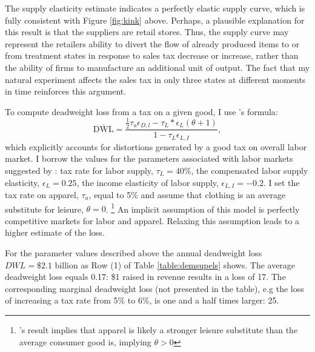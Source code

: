 \documentclass[12pt]{article}
\begin{document}
				
	The supply elasticity estimate indicates a perfectly elastic supply curve, which is fully consistent with Figure \ref{fig:kink} above. Perhaps, a plausible explanation for this result is that the suppliers are retail stores. Thus, the supply curve may represent the retailers ability to divert the flow of already produced items to or from treatment states in response to sales tax decrease or increase, rather than the ability of firms to manufacture an additional unit of output. The fact that my natural experiment affects the sales tax in only three states at different moments in time reinforces this argument.
	
	To compute deadweight loss from a tax on a given good, I use \citep{goulder}'s formula:
	\begin{equation}
	\label{eq:dwl}
	\overline{\text{DWL}}=\frac{\frac{1}{2}\tau_{a}\epsilon_{D,l}-\tau_{L}*\epsilon_{L}(\theta+1)}{1-\tau_{L}\epsilon_{L,I}},
	\end{equation} 
	which explicitly accounts for distortions generated by a good tax on overall labor market.
	I borrow the values for the parameters associated with labor markets suggested by \citet{goulder}: tax rate for labor supply, $\tau_{L}=40\%$, the compensated labor supply elasticity, $\epsilon_{L}=0.25$, the income elasticity of labor supply, $\epsilon_{L,I}=-0.2$. I set the tax rate on apparel, $\tau_{a}$, equal to 5\%  and assume that clothing is an average substitute for leisure, $\theta=0$. \footnote{\citep{aguiar}'s result implies that apparel is likely a stronger leisure substitute than the average consumer good is, implying $\theta>0$ } An implicit assumption of this model is perfectly competitive markets for labor and apparel. Relaxing this assumption leads to a higher estimate of the loss.
	
		
	For the parameter values described above the annual deadweight loss $DWL=\$2.1\textrm{ billion}$ as Row (1) of Table \ref{table:demsupels} shows. The average deadweight loss equals 0.17: \$1 raised in revenue results in a loss of 17\textcent. The corresponding marginal deadweight loss (not presented in the table), e.g the loss of increasing a tax rate from 5\% to 6\%, is one and a half times larger: 25\textcent.
\end{document}
